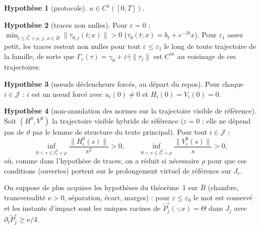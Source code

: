 \documentclass[11pt,a4paper]{article}
\theoremstyle{remark}
\theoremstyle{definition}
\newtheorem{hyp}{Hypothèse}
\newcommand{\norm}[1]{\lVert #1\rVert}
\newcommand{\eps}{\varepsilon}
\newcommand{\vth}{\vartheta}
\newcommand{\Pt}{\widetilde P}
\begin{document}
\begin{hyp}[protocole]\label{h:u} $u\in C^1([0,T])$.\end{hyp}
\begin{hyp}[traces non nulles]\label{h:tn} Pour $\eps=0$ : $\min_{t\le t_r^0+\rho,\,j,\,x\in\bar B}\norm{\tau_{0,j}(t;x)}>0$ ($\tau_0(t;x)=b_{t}+e^{-\beta t}x$). Pour $\eps_1$ assez petit, les traces restent non nulles pour tout $\eps\le\eps_1$ le long de toute trajectoire de la famille, de sorte que $\Gamma_\eps(\tau)=\gamma_0+\eps\bar\gamma\norm{\tau_j}$ est $C^\infty$ au voisinage de ces trajectoires.\end{hyp}
\begin{hyp}[n\oe uds déclencheurs forcés, au départ du repos]\label{h:F} Pour chaque $i\in\mathcal J$ : $i$ est un n\oe ud forcé avec $u_i(0)\ne0$ et $H_i(0)=V_i(0)=0$.\end{hyp}
\begin{hyp}[non-annulation des normes sur la trajectoire visible de référence]\label{h:N}
Soit $(H^0,V^0)$ la trajectoire visible hybride de référence ($\eps=0$ ; elle ne dépend pas de $\vth$ par le lemme de structure du texte principal). Pour tout $i\in\mathcal J$ :
\[
\inf_{0<s\le t_r^0+\rho}\frac{\norm{H^0_i(s)}}{s^2}>0,\qquad \inf_{0<s\le t_r^0+\rho}\frac{\norm{V^0_i(s)}}{s}>0 ,
\]
où, comme dans l'hypothèse de traces, on a réduit si nécessaire $\rho$ pour que ces conditions (ouvertes) portent sur le prolongement virtuel de référence sur $J_r$.
\end{hyp}

On suppose de plus acquises les hypothèses du théorème~1 sur $\bar B$ (chambre, transversalité $\nu>0$, séparation, écart, marges) : pour $\eps\le\eps_0$ le mot est conservé et les instants d'impact sont les uniques racines de $\Pt^\eps_j(\cdot;x)=\Theta$ dans $J_j$ avec $\partial_t\Pt_j^\eps\ge\nu/4$.
\end{document}
